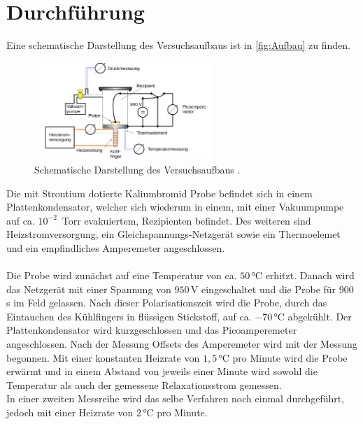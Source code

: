 \section{Durchführung}
\label{sec:Durchführung}
Eine schematische Darstellung des Versuchsaufbaus ist in \autoref{fig:Aufbau} zu finden.
\begin{figure}[H]
  \centering
  \includegraphics[width=0.6\textwidth]{pics/Aufbau.png}
  \caption{Schematische Darstellung des Versuchsaufbaus \cite{Anleitung}.}
  \label{fig:Aufbau}
\end{figure}
Die mit Strontium dotierte Kaliumbromid Probe befindet sich in einem Plattenkondensator,
welcher sich wiederum in einem, mit einer Vakuumpumpe auf ca. $10^{-2}\,$ Torr evakuiertem, Rezipienten befindet.
Des weiteren sind Heizstromversorgung, ein Gleichspannungs-Netzgerät sowie ein Thermoelemet und
ein empfindliches Amperemeter angeschlossen.\\
\\Die Probe wird zunächst auf eine Temperatur von ca. $50\,$°C erhitzt. Danach wird
das Netzgerät mit einer Spannung von $950\,$V eingeschaltet und die Probe für $900\,$s
im Feld gelassen. Nach dieser Polarisationszeit wird die Probe, durch das Eintauchen des Kühlfingers
in flüssigen Stickstoff, auf ca. $-70\,$°C abgekühlt. Der Plattenkondensator wird
kurzgeschlossen und das Picoamperemeter angeschlossen.
Nach der Messung Offsets des Amperemeter wird mit der Messung begonnen.
Mit einer konstanten Heizrate von $1,5\,$°C pro Minute wird die Probe erwärmt und
in einem Abstand von jeweils einer Minute wird sowohl die Temperatur als auch der
gemessene Relaxationsstrom gemessen.\\
In einer zweiten Messreihe wird das selbe Verfahren noch einmal durchgeführt, jedoch mit
einer Heizrate von $2\,$°C pro Minute.
